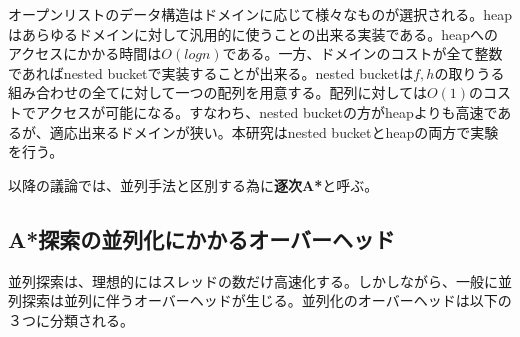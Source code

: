 \documentclass[uplatex]{jsarticle}
\begin{document}
オープンリストのデータ構造はドメインに応じて様々なものが選択される。heapはあらゆるドメインに対して汎用的に使うことの出来る実装である。heapへのアクセスにかかる時間は$O(logn)$である。一方、ドメインのコストが全て整数であればnested bucketで実装することが出来る。nested bucketは$f, h$の取りうる組み合わせの全てに対して一つの配列を用意する。配列に対しては$O(1)$のコストでアクセスが可能になる。すなわち、nested bucketの方がheapよりも高速であるが、適応出来るドメインが狭い。本研究はnested bucketとheapの両方で実験を行う。
\newline

以降の議論では、並列手法と区別する為に\textbf{逐次A*}と呼ぶ。


\subsection{A*探索の並列化にかかるオーバーヘッド}

並列探索は、理想的にはスレッドの数だけ高速化する。しかしながら、一般に並列探索は並列に伴うオーバーヘッドが生じる。並列化のオーバーヘッドは以下の３つに分類される。
\end{document}
